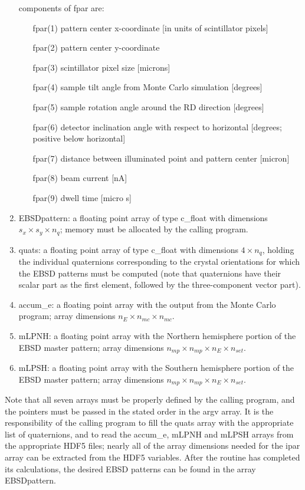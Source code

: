 \documentclass[DIV=calc, paper=letter, fontsize=11pt]{scrartcl}	 %
\begin{document}
\begin{enumerate}
	components of \textsf{fpar} are:
	\begin{enumerate}
		\item[\textsf{fpar}(1)] pattern center x-coordinate [in units of scintillator pixels]
		\item[\textsf{fpar}(2)] pattern center y-coordinate
		\item[\textsf{fpar}(3)] scintillator pixel size [microns]
		\item[\textsf{fpar}(4)] sample tilt angle from Monte Carlo simulation [degrees]
		\item[\textsf{fpar}(5)] sample rotation angle around the RD direction [degrees]
		\item[\textsf{fpar}(6)] detector inclination angle with respect to horizontal [degrees; positive below horizontal]
		\item[\textsf{fpar}(7)] distance between illuminated point and pattern center [micron]
		\item[\textsf{fpar}(8)] beam current [nA]
		\item[\textsf{fpar}(9)] dwell time [micro s]
	\end{enumerate}
	\item \textsf{EBSDpattern}: a floating point array of type \textsf{c\_float} with dimensions $s_x\times s_y\times n_q$; memory must be allocated by the calling program.
	\item \textsf{quats}: a floating point array of type \textsf{c\_float} with dimensions $4\times n_q$, holding the individual quaternions corresponding to the crystal
	orientations for which the EBSD patterns must be computed (note that quaternions have their scalar part as the first element, followed by the three-component vector part).
	\item \textsf{accum\_e}: a floating point array with the output from the Monte Carlo program; array dimensions $n_E\times n_{mc}\times n_{mc}$.
	\item \textsf{mLPNH}: a floating point array with the Northern hemisphere portion of the EBSD master pattern; array dimensions $n_{mp}\times n_{mp}\times n_E\times n_{set}$.
	\item \textsf{mLPSH}: a floating point array with the Southern hemisphere portion of the EBSD master pattern; array dimensions $n_{mp}\times n_{mp}\times n_E\times n_{set}$.
\end{enumerate}
Note that all seven arrays must be properly defined by the calling program, and the pointers must be passed in the stated order in the \textsf{argv} array.  It is 
the responsibility of the calling program to fill the \textsf{quats} array with the appropriate list of quaternions, and to read the \textsf{accum\_e}, \textsf{mLPNH} and
\textsf{mLPSH} arrays from the appropriate HDF5 files; nearly all of the array dimensions needed for the \textsf{ipar} array can be
extracted from the HDF5 variables.  After the routine has completed its calculations, the desired EBSD patterns can be found in the array \textsf{EBSDpattern}.
\end{document}
